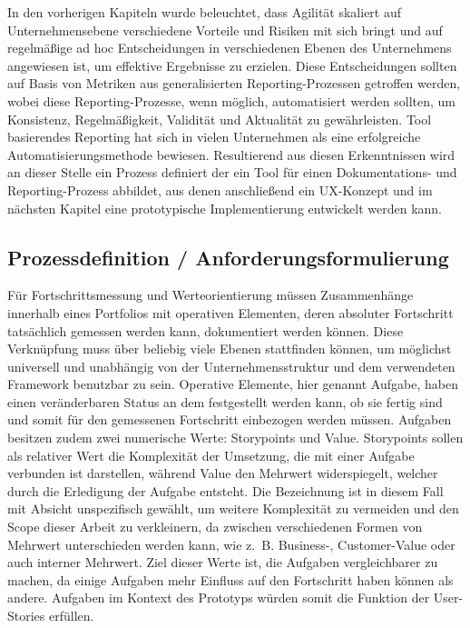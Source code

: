In den vorherigen Kapiteln wurde beleuchtet, dass Agilität skaliert auf Unternehmensebene verschiedene Vorteile und  Risiken mit sich bringt und auf regelmäßige ad hoc Entscheidungen in verschiedenen Ebenen des Unternehmens angewiesen ist, um effektive Ergebnisse zu erzielen. Diese Entscheidungen sollten auf Basis von Metriken aus generalisierten Reporting-Prozessen getroffen werden, wobei diese Reporting-Prozesse, wenn möglich, automatisiert werden sollten, um Konsistenz, Regelmäßigkeit, Validität und Aktualität zu gewährleisten. Tool basierendes Reporting hat sich in vielen Unternehmen als eine erfolgreiche Automatisierungsmethode bewiesen.
Resultierend aus diesen Erkenntnissen wird an dieser Stelle ein Prozess definiert der ein Tool für einen Dokumentations- und Reporting-Prozess abbildet, aus denen anschließend ein UX-Konzept und im nächsten Kapitel eine prototypische Implementierung entwickelt werden kann.

\subsection{Prozessdefinition / Anforderungsformulierung}
Für Fortschrittsmessung und Werteorientierung müssen Zusammenhänge innerhalb eines Portfolios mit operativen Elementen, deren absoluter Fortschritt tatsächlich gemessen werden kann, dokumentiert werden können. Diese Verknüpfung muss über beliebig viele Ebenen stattfinden können, um möglichst universell und unabhängig von der Unternehmensstruktur und dem verwendeten Framework benutzbar zu sein.
Operative Elemente, hier genannt Aufgabe, haben einen veränderbaren Status an dem festgestellt werden kann, ob sie fertig sind und somit für den gemessenen Fortschritt einbezogen werden müssen. Aufgaben besitzen zudem zwei numerische Werte: Storypoints und Value. Storypoints sollen als relativer Wert die Komplexität der Umsetzung, die mit einer Aufgabe verbunden ist darstellen, während Value den Mehrwert widerspiegelt, welcher durch die Erledigung der Aufgabe entsteht. Die Bezeichnung ist in diesem Fall mit Absicht unspezifisch gewählt, um weitere Komplexität zu vermeiden und den Scope dieser Arbeit zu verkleinern, da zwischen verschiedenen Formen von Mehrwert unterschieden werden kann, wie z. B. Business-, Customer-Value oder auch interner Mehrwert. Ziel dieser Werte ist, die Aufgaben vergleichbarer zu machen, da einige Aufgaben mehr Einfluss auf den Fortschritt haben können als andere. Aufgaben im Kontext des Prototyps würden somit die Funktion der User-Stories erfüllen.

